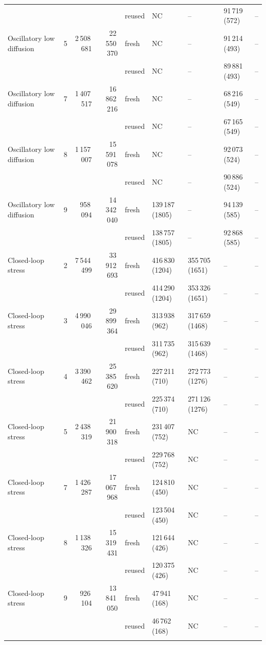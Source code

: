 \begin{tabular}{lrrrlllll}
 & & &  & reused & NC & -- & 91\,719 (572) & --\\
\addlinespace[2pt]
Oscillatory low diffusion & 5 & 2\,508\,681 & 22\,550\,370 & fresh & NC & -- & 91\,214 (493) & --\\
 & & &  & reused & NC & -- & 89\,881 (493) & --\\
\addlinespace[2pt]
Oscillatory low diffusion & 7 & 1\,407\,517 & 16\,862\,216 & fresh & NC & -- & 68\,216 (549) & --\\
 & & &  & reused & NC & -- & 67\,165 (549) & --\\
\addlinespace[2pt]
Oscillatory low diffusion & 8 & 1\,157\,007 & 15\,591\,078 & fresh & NC & -- & 92\,073 (524) & --\\
 & & &  & reused & NC & -- & 90\,886 (524) & --\\
\addlinespace[2pt]
Oscillatory low diffusion & 9 & 958\,094 & 14\,342\,040 & fresh & 139\,187 (1805) & -- & 94\,139 (585) & --\\
 & & &  & reused & 138\,757 (1805) & -- & 92\,868 (585) & --\\
\addlinespace[2pt]
Closed-loop stress & 2 & 7\,544\,499 & 33\,912\,693 & fresh & 416\,830 (1204) & 355\,705 (1651) & -- & --\\
 & & &  & reused & 414\,290 (1204) & 353\,326 (1651) & -- & --\\
\addlinespace[2pt]
Closed-loop stress & 3 & 4\,990\,046 & 29\,899\,364 & fresh & 313\,938 (962) & 317\,659 (1468) & -- & --\\
 & & &  & reused & 311\,735 (962) & 315\,639 (1468) & -- & --\\
\addlinespace[2pt]
Closed-loop stress & 4 & 3\,390\,462 & 25\,385\,620 & fresh & 227\,211 (710) & 272\,773 (1276) & -- & --\\
 & & &  & reused & 225\,374 (710) & 271\,126 (1276) & -- & --\\
\addlinespace[2pt]
Closed-loop stress & 5 & 2\,438\,319 & 21\,900\,318 & fresh & 231\,407 (752) & NC & -- & --\\
 & & &  & reused & 229\,768 (752) & NC & -- & --\\
\addlinespace[2pt]
Closed-loop stress & 7 & 1\,426\,287 & 17\,067\,968 & fresh & 124\,810 (450) & NC & -- & --\\
 & & &  & reused & 123\,504 (450) & NC & -- & --\\
\addlinespace[2pt]
Closed-loop stress & 8 & 1\,138\,326 & 15\,319\,431 & fresh & 121\,644 (426) & NC & -- & --\\
 & & &  & reused & 120\,375 (426) & NC & -- & --\\
\addlinespace[2pt]
Closed-loop stress & 9 & 926\,104 & 13\,841\,050 & fresh & 47\,941 (168) & NC & -- & --\\
 & & &  & reused & 46\,762 (168) & NC & -- & --\\
\addlinespace[2pt]
\bottomrule
\end{tabular}

